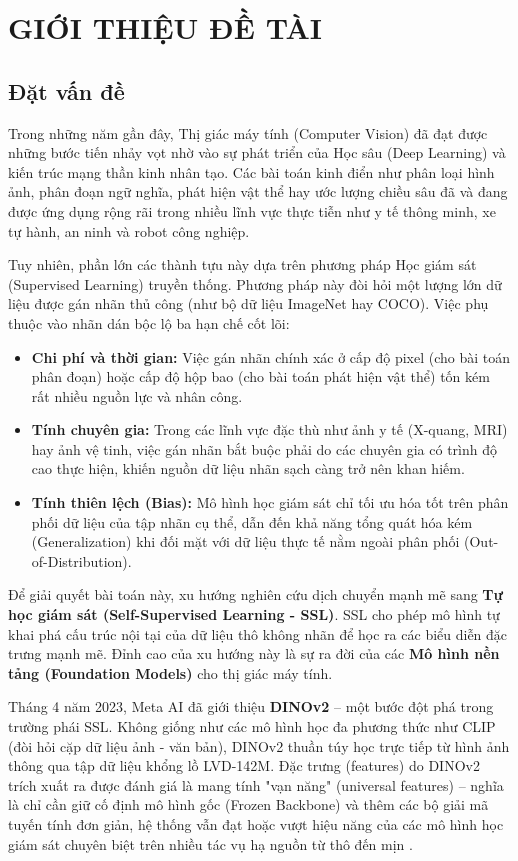 \chapter{GIỚI THIỆU ĐỀ TÀI}
\section{Đặt vấn đề}
Trong những năm gần đây, Thị giác máy tính (Computer Vision) đã đạt được những bước tiến nhảy vọt nhờ vào sự phát triển của Học sâu (Deep Learning) và kiến trúc mạng thần kinh nhân tạo. Các bài toán kinh điển như phân loại hình ảnh, phân đoạn ngữ nghĩa, phát hiện vật thể hay ước lượng chiều sâu đã và đang được ứng dụng rộng rãi trong nhiều lĩnh vực thực tiễn như y tế thông minh, xe tự hành, an ninh và robot công nghiệp.

Tuy nhiên, phần lớn các thành tựu này dựa trên phương pháp Học giám sát (Supervised Learning) truyền thống. Phương pháp này đòi hỏi một lượng lớn dữ liệu được gán nhãn thủ công (như bộ dữ liệu ImageNet hay COCO). Việc phụ thuộc vào nhãn dán bộc lộ ba hạn chế cốt lõi:
\begin{itemize}
    \item \textbf{Chi phí và thời gian:} Việc gán nhãn chính xác ở cấp độ pixel (cho bài toán phân đoạn) hoặc cấp độ hộp bao (cho bài toán phát hiện vật thể) tốn kém rất nhiều nguồn lực và nhân công.
    \item \textbf{Tính chuyên gia:} Trong các lĩnh vực đặc thù như ảnh y tế (X-quang, MRI) hay ảnh vệ tinh, việc gán nhãn bắt buộc phải do các chuyên gia có trình độ cao thực hiện, khiến nguồn dữ liệu nhãn sạch càng trở nên khan hiếm.
    \item \textbf{Tính thiên lệch (Bias):} Mô hình học giám sát chỉ tối ưu hóa tốt trên phân phối dữ liệu của tập nhãn cụ thể, dẫn đến khả năng tổng quát hóa kém (Generalization) khi đối mặt với dữ liệu thực tế nằm ngoài phân phối (Out-of-Distribution).
\end{itemize}

Để giải quyết bài toán này, xu hướng nghiên cứu dịch chuyển mạnh mẽ sang \textbf{Tự học giám sát (Self-Supervised Learning - SSL)}. SSL cho phép mô hình tự khai phá cấu trúc nội tại của dữ liệu thô không nhãn để học ra các biểu diễn đặc trưng mạnh mẽ. Đỉnh cao của xu hướng này là sự ra đời của các \textbf{Mô hình nền tảng (Foundation Models)} cho thị giác máy tính.

Tháng 4 năm 2023, Meta AI đã giới thiệu \textbf{DINOv2} – một bước đột phá trong trường phái SSL. Không giống như các mô hình học đa phương thức như CLIP (đòi hỏi cặp dữ liệu ảnh - văn bản), DINOv2 thuần túy học trực tiếp từ hình ảnh thông qua tập dữ liệu khổng lồ LVD-142M. Đặc trưng (features) do DINOv2 trích xuất ra được đánh giá là mang tính "vạn năng" (universal features) – nghĩa là chỉ cần giữ cố định mô hình gốc (Frozen Backbone) và thêm các bộ giải mã tuyến tính đơn giản, hệ thống vẫn đạt hoặc vượt hiệu năng của các mô hình học giám sát chuyên biệt trên nhiều tác vụ hạ nguồn từ thô đến mịn \cite{oquab2024dinov2learningrobustvisual}.

